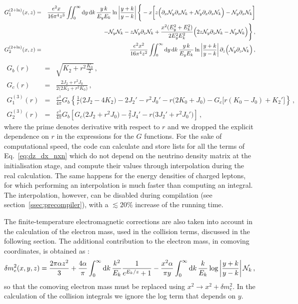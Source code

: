 \documentclass[notitlepage,nofootinbib,showpacs,preprintnumbers,amsmath,amssymb,superscriptaddress,prd,onecolumn]{revtex4-1}
\begin{document}
\begin{eqnarray}
G_1^{(2+\ln)}(x,z)
&=&
\frac{e^2 x}{16\pi^4 z^3}
\int\!\!\!\int_0^\infty
{\rm d}y\,
{\rm d}k\,
\frac{y\,k}{E_y E_k}
\ln\left|\frac{y+k}{y-k}\right|
\Bigg\{
-x\bigg[
  z\Big(
    \partial_x\mathcal{N}_y\partial_z\mathcal{N}_k
    +
    \mathcal{N}_y\partial_x\partial_z\mathcal{N}_k
  \Big)
  -\mathcal{N}_y\partial_x\mathcal{N}_k
\bigg]
\nonumber\\
&&
\qquad\qquad\qquad\qquad
-\mathcal{N}_y\mathcal{N}_k
-z\mathcal{N}_y\partial_z\mathcal{N}_k
+\frac{x^2 (E_y^2+E_k^2)}{2 E_y^2 E_k^2}
\Big(
2z \mathcal{N}_y\partial_z \mathcal{N}_k
-\mathcal{N}_y \mathcal{N}_k
\Big)
\Bigg\}
\,,\\
G_2^{(2+\ln)}(x,z)
&=&
\frac{e^2 x^2}{16\pi^4 z^2}
\int\!\!\!\int_0^\infty
{\rm d}y\,
{\rm d}k\,
\frac{y\,k}{E_y E_k}
\ln\left|\frac{y+k}{y-k}\right|
\partial_z
\Big(
\mathcal{N}_y
\partial_z
\mathcal{N}_k
\Big)
\,,
\end{eqnarray}
%
\begin{eqnarray}
G_b(r)
&=&
\sqrt{K_2 + r^2 \frac{K_0}{2}}
\,,\\
G_c(r)
&=&
\frac{2J_2 + r^2 J_0}{2\Big(2K_2 + r^2 K_0\Big)}
\,,\\
G_1^{(3)}(r)
&=&
\frac{e^3}{4\pi} G_b
\left\{
 \frac{1}{r}\Big(2J_2-4K_2\Big)
 -2J_2'
 -r^2J_0'
 -r\Big(2K_0+J_0\Big)
 -G_c\Big[r(K_0-J_0)+K_2'\Big]
\right\}
\,,\\
G_2^{(3)}(r)
&=&
\frac{e^3}{4\pi} G_b
\left[
 G_c \Big(2J_2 + r^2 J_0\Big)
 -\frac{2}{r}J_4'
 -r\Big(3J_2'+r^2J_0'\Big)
\right]
\,,
\label{eq:g3}
\end{eqnarray}
%
where the prime denotes derivative with respect to $r$ and we dropped the explicit dependence on $r$ in the expressions for the $G$ functions.
For the sake of computational speed, the code can calculate and store lists for all the terms of Eq.~\eqref{eq:dz_dx_nxn}
which do not depend on the neutrino density matrix 
at the initialisation stage, and compute their values through interpolation during the real calculation.
The same happens for the energy densities of charged leptons, for which performing an interpolation
is much faster than computing an integral.
The interpolation, however, can be disabled during compilation (see section~\ref{ssec:precompiler}),
with a $\lesssim20$\% increase of the running time.

The finite-temperature electromagnetic corrections are also taken into account in the calculation
of the electron mass, used in the collision terms, discussed in the following section.
The additional contribution to the electron mass, in comoving coordinates, is obtained as \cite{Fornengo:1997wa,Mangano:2001iu,Bennett:2019ewm}:
\begin{equation}
\delta m_e^2(x, y, z)
=
\frac{2\pi\alpha z^2}{3}
+
\frac{4\alpha}{\pi}
\int_0^\infty{\rm d}k\,
\frac{k^2}{E_k}
\frac{1}{e^{E_k/z}+1}
-
\frac{x^2\alpha}{\pi y}
\int_0^\infty{\rm d}k\,
\frac{k}{E_k}
\log\left|\frac{y+k}{y-k}\right|
\mathcal{N}_k
\,,
\end{equation}
so that the comoving electron mass must be replaced using $x^2\rightarrow x^2+\delta m_e^2$.
In the calculation of the collision integrals we ignore the log term that depends on $y$.
\end{document}
